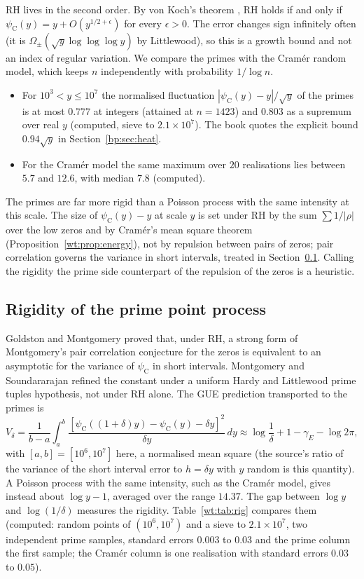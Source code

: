 RH lives in the second order. By von Koch's theorem \cite{vonKoch01}, RH holds if and only if $\psi_{\mathrm C}(y)=y+O(y^{1/2+\epsilon})$ for every $\epsilon>0$. The error changes sign infinitely often (it is $\Omega_\pm(\sqrt y\log\log\log y)$ by Littlewood), so this is a growth bound and not an index of regular variation. We compare the primes with the Cram\'er random model, which keeps $n$ independently with probability $1/\log n$.
\begin{itemize}
\item For $10^3<y\le10^7$ the normalised fluctuation $|\psi_{\mathrm C}(y)-y|/\sqrt y$ of the primes is at most $0.777$ at integers (attained at $n=1423$) and $0.803$ as a supremum over real $y$ (computed, sieve to $2.1\times10^7$). The book quotes the explicit bound $0.94\sqrt y$ in Section~\ref{bp:sec:heat}.
\item For the Cram\'er model the same maximum over $20$ realisations lies between $5.7$ and $12.6$, with median $7.8$ (computed).
\end{itemize}
The primes are far more rigid than a Poisson process with the same intensity at this scale. The size of $\psi_{\mathrm C}(y)-y$ at scale $y$ is set under RH by the sum $\sum1/|\rho|$ over the low zeros and by Cram\'er's mean square theorem (Proposition~\ref{wt:prop:energy}), not by repulsion between pairs of zeros; pair correlation governs the variance in short intervals, treated in Section~\ref{wt:sec:rigidity}. Calling the rigidity the prime side counterpart of the repulsion of the zeros is a heuristic.

\subsection{Rigidity of the prime point process}\label{wt:sec:rigidity}

\begin{resultpar}\label{wt:res:rig}
Goldston and Montgomery \cite{GoldstonMontgomery87} proved that, under RH, a strong form of Montgomery's pair correlation conjecture for the zeros is equivalent to an asymptotic for the variance of $\psi_{\mathrm C}$ in short intervals. Montgomery and Soundararajan \cite{MontgomerySoundararajan04} refined the constant under a uniform Hardy and Littlewood prime tuples hypothesis, not under RH alone. The GUE prediction transported to the primes is
\[
V_\delta=\frac1{b-a}\int_a^b\frac{[\psi_{\mathrm C}((1+\delta)y)-\psi_{\mathrm C}(y)-\delta y]^2}{\delta y}\,dy\approx\log\frac1\delta+1-\gamma_E-\log2\pi,
\]
with $[a,b]=[10^6,10^7]$ here, a normalised mean square (the source's ratio of the variance of the short interval error to $h=\delta y$ with $y$ random is this quantity). A Poisson process with the same intensity, such as the Cram\'er model, gives instead about $\log y-1$, averaged over the range $14.37$. The gap between $\log y$ and $\log(1/\delta)$ measures the rigidity. Table~\ref{wt:tab:rig} compares them (computed: random points of $(10^6,10^7)$ and a sieve to $2.1\times10^7$, two independent prime samples, standard errors $0.003$ to $0.03$ and the prime column the first sample; the Cram\'er column is one realisation with standard errors $0.03$ to $0.05$).
\end{resultpar}

